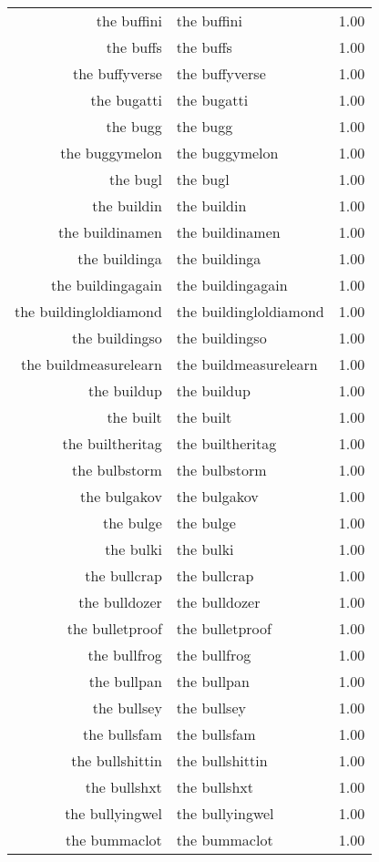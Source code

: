 \begin{table}[ht]
\begin{tabular}{rlr}
  the buffini & the buffini & 1.00 \\ 
  the buffs & the buffs & 1.00 \\ 
  the buffyverse & the buffyverse & 1.00 \\ 
  the bugatti & the bugatti & 1.00 \\ 
  the bugg & the bugg & 1.00 \\ 
  the buggymelon & the buggymelon & 1.00 \\ 
  the bugl & the bugl & 1.00 \\ 
  the buildin & the buildin & 1.00 \\ 
  the buildinamen & the buildinamen & 1.00 \\ 
  the buildinga & the buildinga & 1.00 \\ 
  the buildingagain & the buildingagain & 1.00 \\ 
  the buildingloldiamond & the buildingloldiamond & 1.00 \\ 
  the buildingso & the buildingso & 1.00 \\ 
  the buildmeasurelearn & the buildmeasurelearn & 1.00 \\ 
  the buildup & the buildup & 1.00 \\ 
  the built & the built & 1.00 \\ 
  the builtheritag & the builtheritag & 1.00 \\ 
  the bulbstorm & the bulbstorm & 1.00 \\ 
  the bulgakov & the bulgakov & 1.00 \\ 
  the bulge & the bulge & 1.00 \\ 
  the bulki & the bulki & 1.00 \\ 
  the bullcrap & the bullcrap & 1.00 \\ 
  the bulldozer & the bulldozer & 1.00 \\ 
  the bulletproof & the bulletproof & 1.00 \\ 
  the bullfrog & the bullfrog & 1.00 \\ 
  the bullpan & the bullpan & 1.00 \\ 
  the bullsey & the bullsey & 1.00 \\ 
  the bullsfam & the bullsfam & 1.00 \\ 
  the bullshittin & the bullshittin & 1.00 \\ 
  the bullshxt & the bullshxt & 1.00 \\ 
  the bullyingwel & the bullyingwel & 1.00 \\ 
  the bummaclot & the bummaclot & 1.00 \\ 

\end{tabular}
\end{table}
